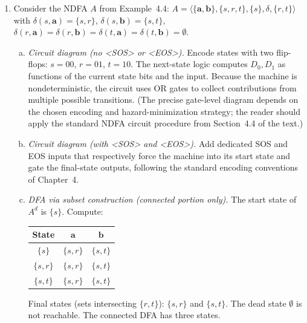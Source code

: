 \begin{enumerate}[{4.}1.]
\begin{enumerate}[(a)]
  \item \emph{Convert to DFA (Definition~4.5).}  Starting from the state
  $\{s_0\}$ (or the appropriate initial set), compute:
  \[
    \delta^d(\{s_0\},\pmb{a}),\quad \delta^d(\{s_0\},\pmb{b}),\quad\ldots
  \]
  and continue until closure is reached.  Since the exact transitions of $E$
  depend on the printed Figure~4.23, the reader should apply the subset
  construction to the NDFA $A^{\sigma}_\lambda$ produced in part~(a),
  grouping into equivalence classes of reachable state-sets.
\end{enumerate}

\item Consider the NDFA $A$ from Example~4.4:
$A=\langle\{\pmb{a},\pmb{b}\},\{s,r,t\},\{s\},\delta,\{r,t\}\rangle$
with $\delta(s,\pmb{a})=\{s,r\}$, $\delta(s,\pmb{b})=\{s,t\}$,
$\delta(r,\pmb{a})=\delta(r,\pmb{b})=\delta(t,\pmb{a})=\delta(t,\pmb{b})=\emptyset$.

\begin{enumerate}[(a)]
  \item \emph{Circuit diagram (no \textless SOS\textgreater{} or
    \textless EOS\textgreater).}  Encode states with two flip-flops:
    $s=00$, $r=01$, $t=10$.  The next-state logic computes
    $D_0,D_1$ as functions of the current state bits and the input.
    Because the machine is nondeterministic, the circuit uses OR gates to
    collect contributions from multiple possible transitions.
    (The precise gate-level diagram depends on the chosen encoding and
    hazard-minimization strategy; the reader should apply the standard
    NDFA circuit procedure from Section~4.4 of the text.)

  \item \emph{Circuit diagram (with \textless SOS\textgreater{} and
    \textless EOS\textgreater).}  Add dedicated SOS and EOS inputs that
    respectively force the machine into its start state and gate the
    final-state outputs, following the standard encoding conventions of
    Chapter~4.

  \item \emph{DFA via subset construction (connected portion only).}
  The start state of $A^d$ is $\{s\}$.  Compute:
  \begin{center}\begin{tabular}{c|cc}
    State & $\pmb{a}$ & $\pmb{b}$ \\\hline
    $\{s\}$ & $\{s,r\}$ & $\{s,t\}$ \\
    $\{s,r\}$ & $\{s,r\}$ & $\{s,t\}$ \\
    $\{s,t\}$ & $\{s,r\}$ & $\{s,t\}$ \\
  \end{tabular}\end{center}
  Final states (sets intersecting $\{r,t\}$): $\{s,r\}$ and $\{s,t\}$.
  The dead state $\emptyset$ is not reachable.  The connected DFA has
  three states.


\end{enumerate}
\end{enumerate}
